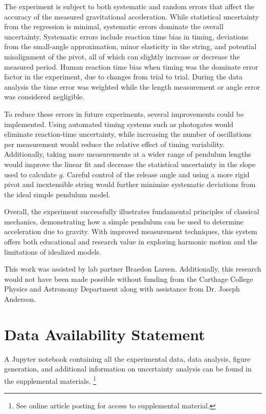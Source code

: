\documentclass[rc]{physicsinprogress}
\begin{document}
The experiment is subject to both systematic and random errors that affect the accuracy of the measured gravitational acceleration. While statistical uncertainty from the regression is minimal, systematic errors dominate the overall uncertainty. Systematic errors include reaction time bias in timing, deviations from the small-angle approximation, minor elasticity in the string, and potential misalignment of the pivot, all of which can slightly increase or decrease the measured period. Human reaction time bias when timing was the dominate error factor in the experiment, due to changes from trial to trial. During the data analysis the time error was weighted while the length measurement or angle error was considered negligible.

To reduce these errors in future experiments, several improvements could be implemented. Using automated timing systems such as photogates would eliminate reaction-time uncertainty, while increasing the number of oscillations per measurement would reduce the relative effect of timing variability. Additionally, taking more measurements at a wider range of pendulum lengths would improve the linear fit and decrease the statistical uncertainty in the slope used to calculate $g$. Careful control of the release angle and using a more rigid pivot and inextensible string would further minimize systematic deviations from the ideal simple pendulum model.

Overall, the experiment successfully illustrates fundamental principles of classical mechanics, demonstrating how a simple pendulum can be used to determine acceleration due to gravity. With improved measurement techniques, this system offers both educational and research value in exploring harmonic motion and the limitations of idealized models.

\begin{acknowledgments}
This work was assisted by lab partner Braedon Larsen. Additionally, this research would not have been made possible without funding from the Carthage College Physics and Astronomy Department along with assistance from Dr. Joseph Anderson.
\end{acknowledgments}

\section*{Data Availability Statement}
A Jupyter notebook containing all the experimental data, data analysis, figure generation, and additional information on uncertainty analysis can be found in the supplemental materials. \footnote{See online article posting for access to supplemental material.}



\end{document}
